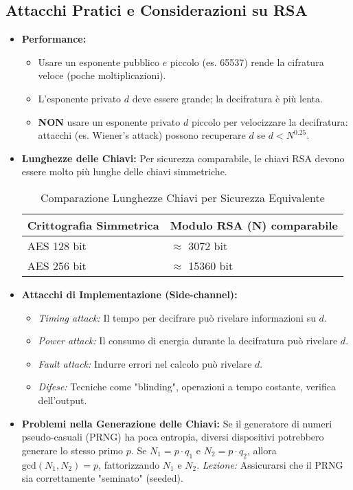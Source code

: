 \documentclass{article}
\begin{document}
\subsection{Attacchi Pratici e Considerazioni su RSA}
\begin{itemize}
    \item \textbf{Performance:}
    \begin{itemize}
        \item Usare un esponente pubblico $e$ piccolo (es. 65537) rende la cifratura veloce (poche moltiplicazioni).
        \item L'esponente privato $d$ deve essere grande; la decifratura è più lenta.
        \item \textbf{NON} usare un esponente privato $d$ piccolo per velocizzare la decifratura: attacchi (es. Wiener's attack) possono recuperare $d$ se $d < N^{0.25}$.
    \end{itemize}
    \item \textbf{Lunghezze delle Chiavi:} Per sicurezza comparabile, le chiavi RSA devono essere molto più lunghe delle chiavi simmetriche.
    \begin{table}[H]
    \centering
    \begin{tabular}{|l|l|}
    \hline
    \textbf{Crittografia Simmetrica} & \textbf{Modulo RSA (N) comparabile} \\
    \hline
    AES 128 bit & $\approx$ 3072 bit \\
    \hline
    AES 256 bit & $\approx$ 15360 bit \\
    \hline
    \end{tabular}
    \caption{Comparazione Lunghezze Chiavi per Sicurezza Equivalente}
    \label{tab:keylengths}
    \end{table}
    \item \textbf{Attacchi di Implementazione (Side-channel):}
    \begin{itemize}
        \item \textit{Timing attack:} Il tempo per decifrare può rivelare informazioni su $d$.
        \item \textit{Power attack:} Il consumo di energia durante la decifratura può rivelare $d$.
        \item \textit{Fault attack:} Indurre errori nel calcolo può rivelare $d$.
        \item \textit{Difese:} Tecniche come "blinding", operazioni a tempo costante, verifica dell'output.
    \end{itemize}
    \item \textbf{Problemi nella Generazione delle Chiavi:} Se il generatore di numeri pseudo-casuali (PRNG) ha poca entropia, diversi dispositivi potrebbero generare lo stesso primo $p$. Se $N_1 = p \cdot q_1$ e $N_2 = p \cdot q_2$, allora $\text{gcd}(N_1, N_2) = p$, fattorizzando $N_1$ e $N_2$.
    \textit{Lezione:} Assicurarsi che il PRNG sia correttamente "seminato" (seeded).
\end{itemize}
\end{document}
